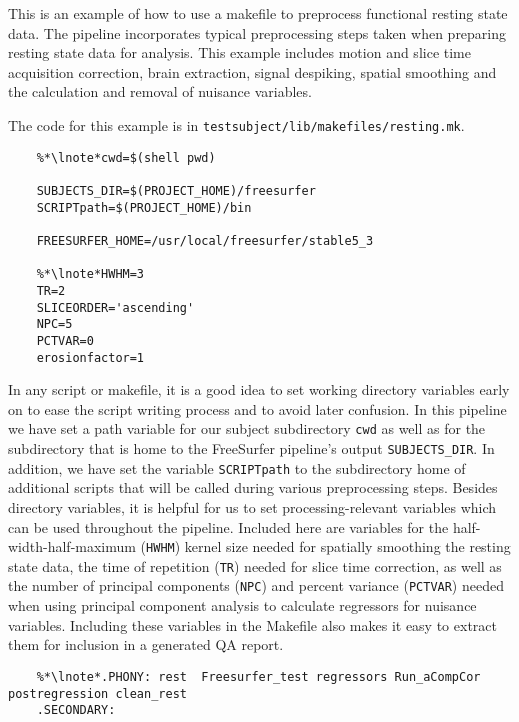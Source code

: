 \label{example:restingstate}
This is an example of how to use a makefile to preprocess functional resting state data. The pipeline incorporates typical preprocessing steps taken when preparing resting state data for analysis. This example includes motion and slice time acquisition correction, brain extraction, signal despiking, spatial smoothing and the calculation and removal of nuisance variables.

The code for this example is in \texttt{testsubject/lib/makefiles/resting.mk}. 

\setcounter{codehighlight}{0} %
\begin{lstlisting}
	%*\lnote*cwd=$(shell pwd)

	SUBJECTS_DIR=$(PROJECT_HOME)/freesurfer
	SCRIPTpath=$(PROJECT_HOME)/bin

	FREESURFER_HOME=/usr/local/freesurfer/stable5_3

	%*\lnote*HWHM=3
	TR=2
	SLICEORDER='ascending'
	NPC=5
	PCTVAR=0
	erosionfactor=1
\end{lstlisting}

 In any script or makefile, it is a good idea to set working
directory variables early on to ease the script writing process and to
avoid later confusion.  In this pipeline we have set a path variable
for our subject subdirectory \texttt{cwd} as well as for the
subdirectory that is home to the FreeSurfer pipeline's output
\texttt{SUBJECTS\_DIR}. In addition, we have set the variable
\texttt{SCRIPTpath} to the subdirectory home of additional scripts
that will be called during various preprocessing steps. 
Besides directory variables, it is helpful for us to set
processing-relevant variables which can be used throughout the
pipeline. Included here are variables for the half-width-half-maximum
(\texttt{HWHM}) kernel size needed for spatially smoothing the resting
state data, the time of repetition (\texttt{TR}) needed for slice time
correction, as well as the number of principal components
(\texttt{NPC}) and percent variance (\texttt{PCTVAR}) needed when
using principal component analysis to calculate regressors for
nuisance variables. Including these variables in the Makefile also
makes it easy to extract them for inclusion in a generated QA report.

\begin{lstlisting}
	%*\lnote*.PHONY: rest  Freesurfer_test regressors Run_aCompCor postregression clean_rest
	.SECONDARY:
\end{lstlisting}

